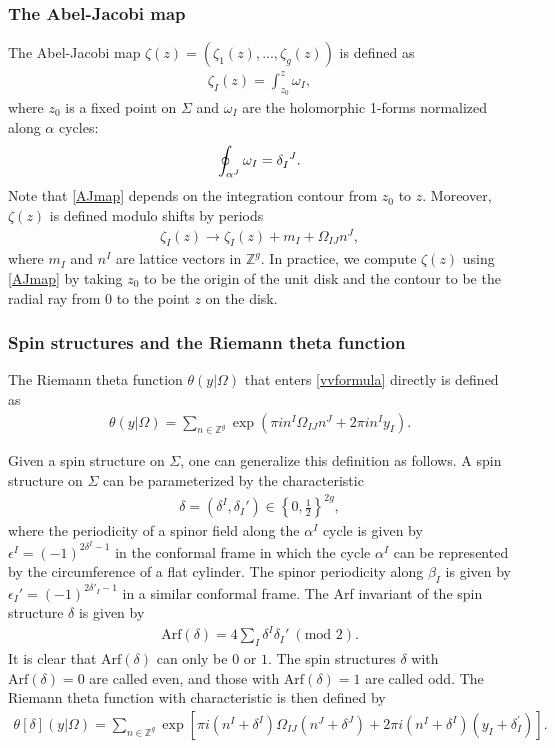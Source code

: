 \documentclass[12pt]{article}
\def\ie{\begin{equation}\begin{aligned}}
\def\fe{\end{aligned}\end{equation}}
\numberwithin{equation}{section}
\begin{document}
\subsubsection*{The Abel-Jacobi map}

The Abel-Jacobi map $\zeta(z)=(\zeta_1(z),...,\zeta_g(z))$ is defined as
\ie \label{AJmap}
\zeta_I(z) = \int_{z_0}^z \omega_I,
\fe
where $z_0$ is a fixed point on $\Sigma$ and $\omega_I$ are the holomorphic 1-forms normalized along $\alpha$ cycles:
\ie
\oint_{\alpha^J}\omega_I=\tensor{\delta}{_I^J}.
\fe Note that \eqref{AJmap} depends on the integration contour from $z_0$ to $z$. Moreover, $\zeta(z)$ is defined modulo shifts by periods
\ie \label{AJshift}
\zeta_I(z) \rightarrow \zeta_I(z)+ m_I + \Omega_{IJ}n^J,
\fe
where $m_I$ and $n^I$ are lattice vectors in $\mathbb{Z}^g$. In practice, we compute $\zeta(z)$ using \eqref{AJmap} by taking $z_0$ to be the origin of the unit disk and the contour to be the radial ray from $0$ to the point $z$ on the disk.

\subsubsection*{Spin structures and the Riemann theta function}

The Riemann theta function $\theta(y|\Omega)$ that enters \eqref{vvformula} directly is defined as
\ie
\label{eq:RiemannThetaFunction}
\theta(y|\Omega)=\sum_{n \in \mathbb{Z}^g} \exp \left(\pi in^I \Omega_{I J}n^J+2 \pi in^I y_I\right).
\fe

Given a spin structure on $\Sigma$, one can generalize this definition as follows. A spin structure on $\Sigma$ can be parameterized by the characteristic
\ie \label{spinstr}
\delta=(\delta^I, \delta_I')\in \left\{0,\tfrac{1}{2}\right\}^{2g},
\fe
where the periodicity of a spinor field along the $\alpha^I$ cycle is given by $\epsilon^I=(-1)^{2\delta^I-1}$ in the conformal frame in which the cycle $\alpha^I$ can be represented by the circumference of a flat cylinder. The spinor periodicity along $\beta_I$ is given by $\epsilon_I'=(-1)^{2\delta'_I-1}$ in a similar conformal frame. The Arf invariant of the spin structure $\delta$ is given by
\ie \label{arf}
\mathrm{Arf}(\delta)=4\sum_{I}\delta^I \delta_I'\ (\text{mod }2).
\fe 
It is clear that $\mathrm{Arf}(\delta)$ can only be $0$ or $1$. The spin structures $\delta$ with $\mathrm{Arf}(\delta) = 0$ are called even, and those with $\mathrm{Arf}(\delta) = 1$ are called odd. The Riemann theta function with characteristic is then defined by 
\ie
\theta[\delta](y |\Omega) = \sum_{n \in \mathbb{Z}^g} \exp \left[\pi i (n^I+\delta^I) \Omega_{I J}(n^J+\delta^J)+2 \pi i(n^I+\delta^I)(y_I+\delta_I^{\prime})\right].
\fe
\end{document}
